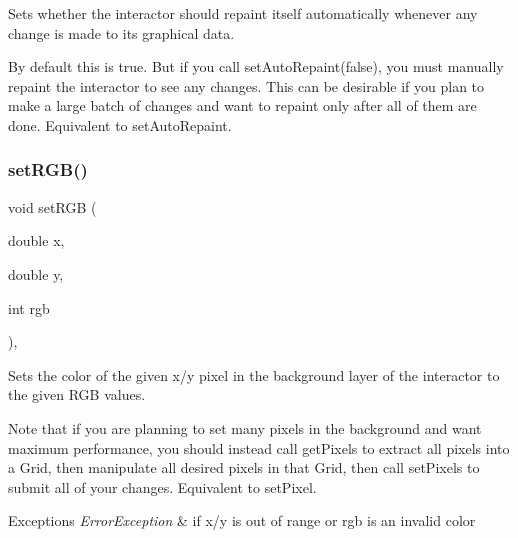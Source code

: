 Sets whether the interactor should repaint itself automatically whenever any change is made to its graphical data. 

By default this is true. But if you call set\+Auto\+Repaint(false), you must manually repaint the interactor to see any changes. This can be desirable if you plan to make a large batch of changes and want to repaint only after all of them are done. Equivalent to set\+Auto\+Repaint. \mbox{\label{classGDrawingSurface_a8bcbd65fa784bdab1e66a9efd381162d}} 
\subsubsection{\texorpdfstring{set\+R\+G\+B()}{setRGB()}\hspace{0.1cm}{\footnotesize\ttfamily [1/3]}}
{\footnotesize\ttfamily void set\+R\+GB (\begin{DoxyParamCaption}\item[{double}]{x,  }\item[{double}]{y,  }\item[{int}]{rgb }\end{DoxyParamCaption})\hspace{0.3cm}{\ttfamily [virtual]}, {\ttfamily [inherited]}}



Sets the color of the given x/y pixel in the background layer of the interactor to the given R\+GB values. 

Note that if you are planning to set many pixels in the background and want maximum performance, you should instead call get\+Pixels to extract all pixels into a Grid, then manipulate all desired pixels in that Grid, then call set\+Pixels to submit all of your changes. Equivalent to set\+Pixel.


\begin{DoxyExceptions}{Exceptions}
{\em Error\+Exception} & if x/y is out of range or rgb is an invalid color \\
\hline
\end{DoxyExceptions}
\mbox{\label{classGDrawingSurface_a81202471d4fc9f2015aef0bc073acfab}} 

